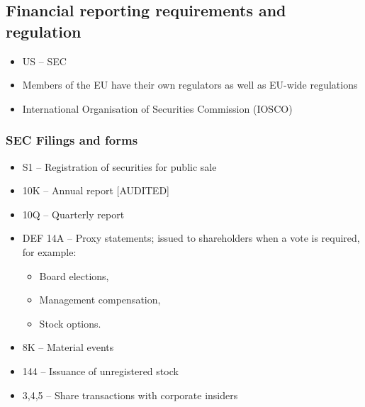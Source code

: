 \documentclass[../notes_compiled.tex]{subfiles}
\begin{document}
\subsection{Financial reporting requirements and regulation}
\begin{itemize}
\item US -- SEC
\item Members of the EU have their own regulators as well as EU-wide regulations
\item International Organisation of Securities Commission (IOSCO)
\end{itemize}

\subsubsection{SEC Filings and forms}
\begin{itemize}
\item S1 -- Registration of securities for public sale
\item 10K -- Annual report [AUDITED]
\item 10Q -- Quarterly report
\item DEF 14A -- Proxy statements; issued to shareholders when a vote is required, for example:
\begin{itemize}
\item Board elections,
\item Management compensation,
\item Stock options.
\end{itemize}
\item 8K -- Material events
\item 144 -- Issuance of unregistered stock
\item 3,4,5 -- Share transactions with corporate insiders
\end{itemize}
\end{document}
